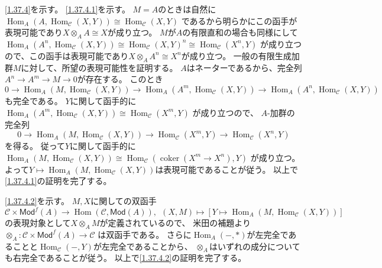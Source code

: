 \documentclass[uplatex,dvipdfmx]{jsarticle}
\makeatletter
\theoremstyle{definition}
\renewenvironment{proof}[1][\proofname]{
  \pushQED{\qed}%
  \normalfont \topsep6\p@\@plus6\p@\relax
  \trivlist
  \item[\hskip\labelsep
    #1\@addpunct{\textbf{.}}]\ignorespaces
}{%
  \popQED\endtrivlist\@endpefalse
}
\providecommand{\proofname}{証明}
\DeclareMathOperator{\Hom}{\mathrm{Hom}}
\DeclareMathOperator{\coker}{\mathrm{coker}}
\newcommand{\Mod}{\mathsf{Mod}}
\newcommand\mcC{\mathcal{C}}
\makeatother
\begin{document}
\begin{proof}
  \ref{1.37.4}を示す。
  \ref{1.37.4.1}を示す。
  \(M=A\)のときは自然に
  \(\Hom_A(A,\Hom_{\mcC}(X,Y)) \cong \Hom_{\mcC}(X,Y)\)
  であるから明らかにこの函手が表現可能であり\(X\otimes_A A\cong X\)が成り立つ。
  \(M\)が\(A\)の有限直和の場合も同様にして
  \(\Hom_A(A^n,\Hom_{\mcC}(X,Y))\cong \Hom_{\mcC}(X,Y)^n \cong \Hom_{\mcC}(X^n,Y)\)
  が成り立つので、この函手は表現可能であり\(X\otimes_A A^n \cong X^n\)が成り立つ。
  一般の有限生成加群\(M\)に対して、所望の表現可能性を証明する。
  \(A\)はネーターであるから、完全列
  \(A^n\to A^m\to M\to 0\)が存在する。
  このとき
  \[
  0 \to \Hom_A(M,\Hom_{\mcC}(X,Y)) \to \Hom_A(A^m,\Hom_{\mcC}(X,Y))
  \to \Hom_A(A^n,\Hom_{\mcC}(X,Y))
  \]
  も完全である。
  \(Y\)に関して函手的に
  \(\Hom_A(A^m,\Hom_{\mcC}(X,Y)) \cong \Hom_{\mcC}(X^m,Y)\)
  が成り立つので、
  \(A\)-加群の完全列
  \[
  0\to \Hom_A(M,\Hom_{\mcC}(X,Y)) \to \Hom_{\mcC}(X^m,Y)\to \Hom_{\mcC}(X^n,Y)
  \]
  を得る。
  従って\(Y\)に関して函手的に
  \(\Hom_A(M,\Hom_{\mcC}(X,Y)) \cong \Hom_{\mcC}(\coker(X^m\to X^n),Y)\)
  が成り立つ。
  よって\(Y\mapsto \Hom_A(M,\Hom_{\mcC}(X,Y))\)は表現可能であることが従う。
  以上で\ref{1.37.4.1}の証明を完了する。

  \ref{1.37.4.2}を示す。
  \(M,X\)に関しての双函手
  \[
  \mcC\times \Mod^f(A) \to \Hom(\mcC,\Mod(A)), \ \
  (X,M)\mapsto [Y\mapsto \Hom_A(M,\Hom_{\mcC}(X,Y))]\]
  の表現対象として\(X\otimes_A M\)が定義されているので、
  米田の補題より\(\otimes_A:\mcC\times \Mod^f(A)\to \mcC\)
  は双函手である。
  さらに\(\Hom_A(-,*)\)が左完全であることと\(\Hom_{\mcC}(-,Y)\)が左完全であることから、
  \(\otimes_A\)はいずれの成分についても右完全であることが従う。
  以上で\ref{1.37.4.2}の証明を完了する。


\end{proof}
\end{document}
